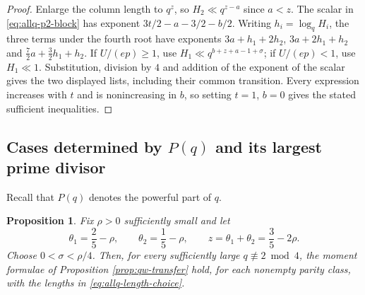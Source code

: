 \documentclass[12pt, a4paper]{amsart}
\numberwithin{equation}{section}
\renewcommand{\ge}{\geqslant}
\theoremstyle{plain}
\newtheorem{prop}[lem]{Proposition}
\begin{document}
\begin{proof}
Enlarge the column length to $q^{z}$, so $H_2\ll q^{z-a}$ since $a<z$. The scalar in \eqref{eq:allq-p2-block} has exponent $3t/2-a-3/2-b/2$. Writing $h_i=\log_qH_i$, the three terms under the fourth root have exponents $3a+h_1+2h_2$, $3a+2h_1+h_2$ and $\frac72a+\frac32h_1+h_2$. If $U/(ep)\ge1$, use $H_1\ll q^{b+z+a-1+\sigma}$; if $U/(ep)<1$, use $H_1\ll1$. Substitution, division by $4$ and addition of the exponent of the scalar gives the two displayed lists, including their common transition. Every expression increases with $t$ and is nonincreasing in $b$, so setting $t=1$, $b=0$ gives the stated sufficient inequalities.
\end{proof}

\subsection{Cases determined by $P(q)$ and its largest prime divisor}

Recall that $P(q)$ denotes the powerful part of $q$.

\begin{prop}\label{prop:allq-three-eighths-moment}
Fix $\rho>0$ sufficiently small and let
\begin{equation}\label{eq:allq-length-choice}
\theta_1=\frac25-\rho,
\qquad
\theta_2=\frac15-\rho,
\qquad
z=\theta_1+\theta_2=\frac35-2\rho.
\end{equation}
 Choose $0<\sigma<\rho/4$. Then, for every sufficiently large $q\not\equiv2\bmod4$, the moment formulae of Proposition \ref{prop:qw-transfer} hold, for each nonempty parity class, with the lengths in \eqref{eq:allq-length-choice}.
\end{prop}
\end{document}
